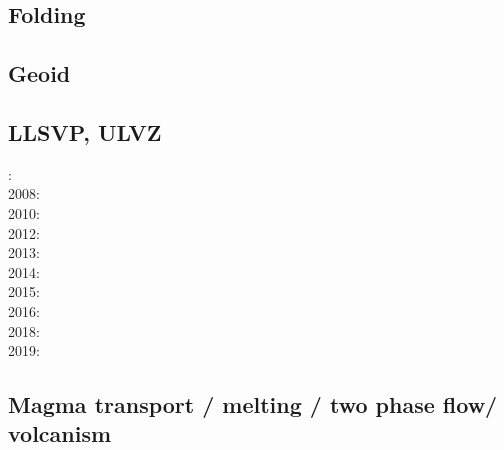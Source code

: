 \subsection*{Folding}

\noindent
\cite{ramb68}
\cite{ramb70}
\cite{ramb71}
\cite{flet91}
\cite{flet95}
\cite{frsc06}
\cite{schm08}
\cite{resb10}
\cite{freh11}
\cite{reds12}\cite{grsc12}
\cite{regc13}
\cite{freh14}\cite{frex14}
\cite{frsc16}


\subsection*{Geoid}

\cite{davi84}\cite{hage84}
\cite{davi86}
\cite{zhgu92}\cite{kiha92}
\cite{zhch93}\cite{rirl93}
\cite{king95}
\cite{mogu96}
\cite{cava98}
\cite{king09}
\cite{hibi12}
\cite{grab17}
\cite{king18}

\subsection*{LLSVP, ULVZ}

: \cite{heta07}\\
2008: \cite{gamc08}\\
2010: \cite{stto10}\\
2012: \cite{stto12}\cite{dagd12}\cite{dect12}\\
2013: \cite{limc13}\cite{bogs13a}\\
2014: \cite{budt14}\cite{lidt14}\\
2015: \cite{musd15}\cite{hafg15}\cite{mczh05a}\\
2016: \cite{dost16}\\
2018: \cite{daga18}\\
2019: \cite{hebo19}

\subsection*{Magma transport / melting / two phase flow/ volcanism}

